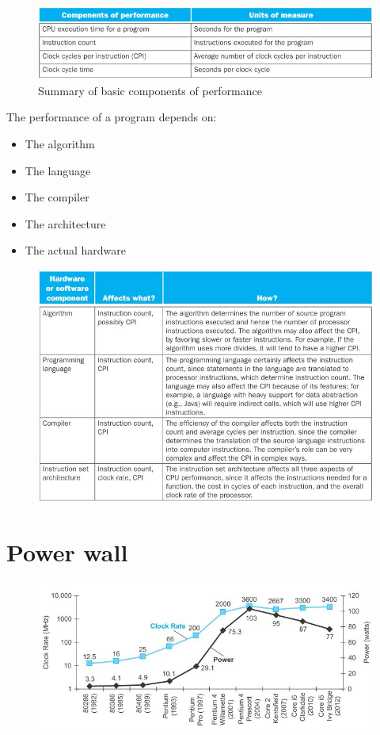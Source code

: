 \documentclass[10pt,a4paper]{article}
\begin{document}
\begin{figure} [h!]
    \centering
    \includegraphics[scale=0.75]{Perform.JPG}
    \caption{Summary of basic components of performance}
\end{figure}

The performance of a program depends on:
\begin{itemize}
    \item The algorithm
    \item The language
    \item The compiler
    \item The architecture
    \item The actual hardware
\end{itemize}  

\begin{figure} [h!]
    \centering
    \includegraphics[scale=0.75]{Instruction.JPG}
\end{figure}

\pagebreak

\section{Power wall}

\begin{figure} [h!]
    \centering
    \includegraphics[scale=0.8]{CPU.JPG}
\end{figure}
\end{document}
